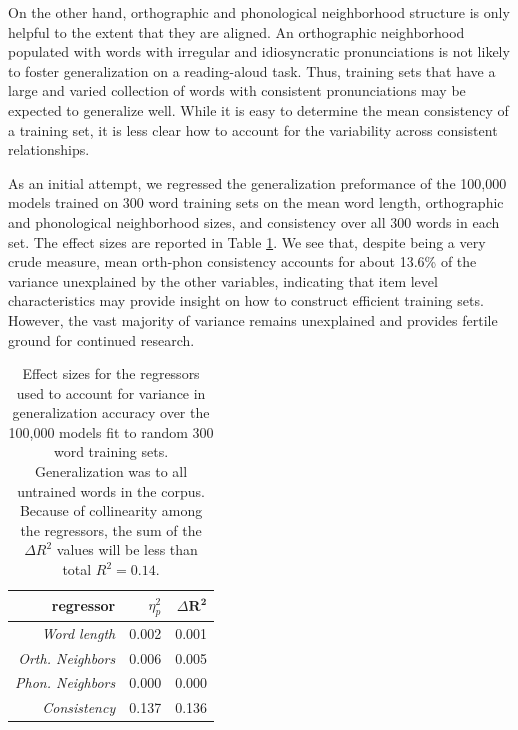 \documentclass[10pt,letterpaper]{article}
\begin{document}
On the other hand, orthographic and phonological neighborhood structure is only helpful to the extent that they are aligned.
An orthographic neighborhood populated with words with irregular and idiosyncratic pronunciations is not likely to foster generalization on a reading-aloud task.
Thus, training sets that have a large and varied collection of words with consistent pronunciations may be expected to generalize well.
While it is easy to determine the mean consistency of a training set, it is less clear how to account for the variability across consistent relationships.

As an initial attempt, we regressed the generalization preformance of the 100,000 models trained on 300 word training sets on the mean word length, orthographic and phonological neighborhood sizes, and consistency over all 300 words in each set.
The effect sizes are reported in Table \ref{tab:effectsize_model}.
We see that, despite being a very crude measure, mean orth-phon consistency accounts for about 13.6\% of the variance unexplained by the other variables, indicating that item level characteristics may provide insight on how to construct efficient training sets.
However, the vast majority of variance remains unexplained and provides fertile ground for continued research.

\begin{table}
	\begin{center}
	\begin{tabular}{r r r}
					\textbf{regressor} & $\eta^2_p$ & $\Delta \mathbf{R^2}$ \\
		\toprule
		\textit{Word length}       & 0.002 & 0.001 \\
		\textit{Orth. Neighbors}   & 0.006 & 0.005 \\
		\textit{Phon. Neighbors}   & 0.000 & 0.000 \\
		\textit{Consistency}       & 0.137 & 0.136 \\
		\bottomrule
		
	\end{tabular}
\end{center}
\caption{Effect sizes for the regressors used to account for variance in generalization accuracy over the 100,000 models fit to random 300 word training sets. Generalization was to all untrained words in the corpus. Because of collinearity among the regressors, the sum of the $\Delta R^2$ values will be less than total $R^2 = 0.14$.}
\label{tab:effectsize_model}
\end{table}
\end{document}
